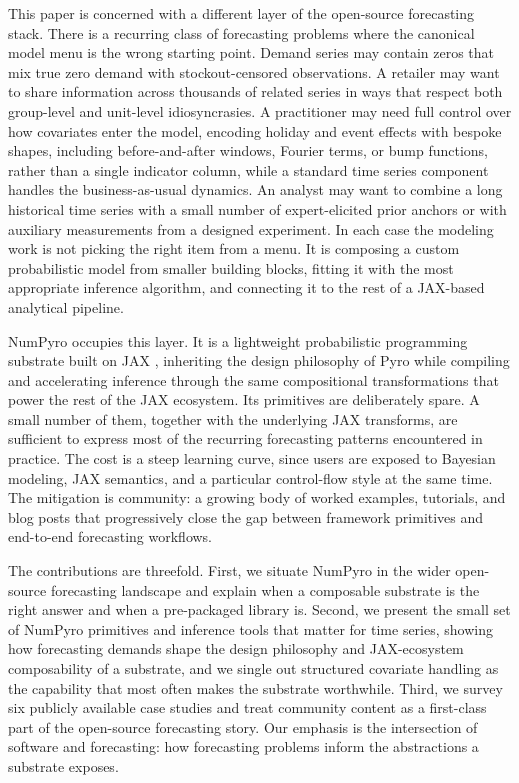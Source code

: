 \documentclass[11pt,3p,review,authoryear]{elsarticle}
\begin{document}
This paper is concerned with a different layer of the open-source forecasting stack. There is a recurring class of forecasting problems where the canonical model menu is the wrong starting point. Demand series may contain zeros that mix true zero demand with stockout-censored observations. A retailer may want to share information across thousands of related series in ways that respect both group-level and unit-level idiosyncrasies. A practitioner may need full control over how covariates enter the model, encoding holiday and event effects with bespoke shapes, including before-and-after windows, Fourier terms, or bump functions, rather than a single indicator column, while a standard time series component handles the business-as-usual dynamics. An analyst may want to combine a long historical time series with a small number of expert-elicited prior anchors or with auxiliary measurements from a designed experiment. In each case the modeling work is not picking the right item from a menu. It is composing a custom probabilistic model from smaller building blocks, fitting it with the most appropriate inference algorithm, and connecting it to the rest of a JAX-based analytical pipeline.

NumPyro \citep{phan2019composable} occupies this layer. It is a lightweight probabilistic programming substrate built on JAX \citep{jax2018github}, inheriting the design philosophy of Pyro \citep{bingham2019pyro} while compiling and accelerating inference through the same compositional transformations that power the rest of the JAX ecosystem. Its primitives are deliberately spare. A small number of them, together with the underlying JAX transforms, are sufficient to express most of the recurring forecasting patterns encountered in practice. The cost is a steep learning curve, since users are exposed to Bayesian modeling, JAX semantics, and a particular control-flow style at the same time. The mitigation is community: a growing body of worked examples, tutorials, and blog posts that progressively close the gap between framework primitives and end-to-end forecasting workflows.

The contributions are threefold. First, we situate NumPyro in the wider open-source forecasting landscape and explain when a composable substrate is the right answer and when a pre-packaged library is. Second, we present the small set of NumPyro primitives and inference tools that matter for time series, showing how forecasting demands shape the design philosophy and JAX-ecosystem composability of a substrate, and we single out structured covariate handling as the capability that most often makes the substrate worthwhile. Third, we survey six publicly available case studies and treat community content as a first-class part of the open-source forecasting story. Our emphasis is the intersection of software and forecasting: how forecasting problems inform the abstractions a substrate exposes.
\end{document}
